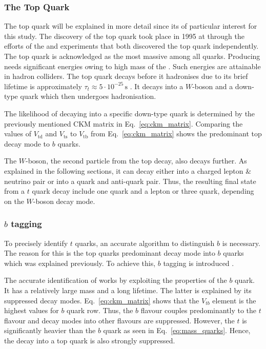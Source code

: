 \documentclass[bachelor,ngerman,english]{GAUBM}
\begin{document}
\subsubsection*{The Top Quark}
The top quark will be explained in more detail since its of particular interest for this study. The discovery of the top quark took place in 1995 at \fermilab through the efforts of the \dzero \cite{theory:top_discovery_01} and \cdf \cite{theory:top_discovery_02} experiments that both discovered the top quark independently. The top quark is acknowledged as the most massive among all quarks. Producing \tquarks needs significant energies owing to high mass of the \tquark. Such energies are attainable in hadron colliders. The top quark decays before it hadronises due to its brief lifetime is approximately $\tau_t\approx5\cdot10^{-25}\,\text{s}$ \cite{pdg}. It decays into a $W$-boson and a down-type quark which then undergoes hadronisation. 

The likelihood of decaying into a specific down-type quark is determined by the previously mentioned CKM matrix in Eq.~\ref{eq:ckm_matrix}. Comparing the values of $V_\text{td}$ and $V_\text{ts}$ to $V_\text{tb}$ from Eq.~\ref{eq:ckm_matrix} shows the predominant top decay mode to $b$ quarks.
 
The $W$-boson, the second particle from the top decay, also decays further. As explained in the following sections, it can decay either into a charged lepton \& neutrino pair or into a quark and anti-quark pair. Thus, the resulting final state from a $t$ quark decay include one quark and a lepton or three quark, depending on the $W$-boson decay mode. 

\subsubsection*{$b$ tagging}
To precisely identify $t$ quarks, an accurate algorithm to distinguish $b$ is necessary. The reason for this is the top quarks predominant decay mode into $b$ quarks which was explained previously. To achieve this, $b$ tagging is introduced \cite{btag:atlas,btag:cms}.

The accurate identification of works by exploiting the properties of the $b$ quark. It has a relatively large mass and a long lifetime. The latter is explained by its suppressed decay modes. Eq.~\ref{eq:ckm_matrix} shows that the $V_{tb}$ element is the highest values for $b$ quark row. Thus, the $b$ flavour couples predominantly to the $t$ flavour and decay modes into other flavours are suppressed. However, the $t$ is significantly heavier than the $b$ quark as seen in Eq.~\ref{eq:mass_quarks}. Hence, the decay into a top quark is also strongly suppressed.
\end{document}

